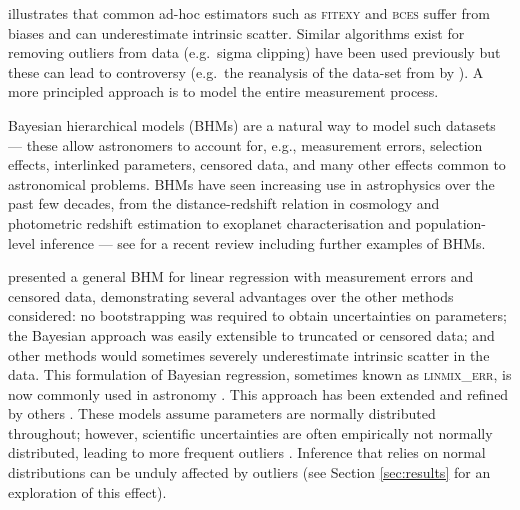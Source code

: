 \documentclass[fleqn,usenatbib]{rasti}
\begin{document}
\citet{Kelly:2007} illustrates that common ad-hoc estimators such as
\textsc{fitexy} \citep{Press:1992, Tremaine:2002} and \textsc{bces}
\citep{Akritas:1996} suffer from biases and can underestimate intrinsic scatter.
Similar algorithms exist for removing outliers from data (e.g.\ sigma clipping)
have been used previously but these can lead to controversy (e.g.\ the
reanalysis of the data-set from \citealt{Riess:2011} by \citealt{Efstathiou:2014}). A more principled
approach is to model the entire measurement process.

Bayesian hierarchical models (BHMs) are a natural way to model such datasets ---
these allow astronomers to account for, e.g., measurement errors, selection
effects, interlinked parameters, censored data, and many other effects common to
astronomical problems. BHMs have seen increasing use in astrophysics over the
past few decades, from the distance-redshift relation in cosmology
\citep[e.g.][]{Feeney:2018, Avelino:2019} and photometric redshift estimation
\citep[e.g.][]{Leistedt:2016} to exoplanet characterisation
\citep[e.g.][]{Sestovic:2018} and population-level inference
\citep[e.g.][]{Kelly:2009} --- see \citet{Feigelson:2021} for a recent review
including further examples of BHMs.

\citet{Kelly:2007} presented a general BHM for linear regression with measurement errors and censored data, demonstrating  several advantages
over the other methods considered: no bootstrapping was required to obtain
uncertainties on parameters; the Bayesian approach was easily extensible to
truncated or censored data; and other methods would sometimes severely
underestimate intrinsic scatter in the data. This formulation of Bayesian
regression, sometimes known as \textsc{linmix\_err}, is now commonly used in
astronomy \citep[e.g.][]{McConnell:2013, Bentz:2013, Andrews:2013}.
This approach has been extended and refined by others
\citep[e.g.][]{Mantz:2016, Sereno:2016, Bartlett:2023}. These models assume
parameters are normally distributed throughout; however, scientific
uncertainties are often empirically not normally distributed, leading to more
frequent outliers \citep{Bailey:2017}. Inference that relies on normal
distributions can be unduly affected by outliers (see Section \ref{sec:results}
for an exploration of this effect).
\end{document}
